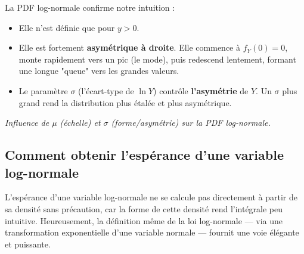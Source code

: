 \begin{intuitionbox}
La PDF log-normale confirme notre intuition :
\begin{itemize}
    \item Elle n'est définie que pour $y > 0$.
    \item Elle est fortement \textbf{asymétrique à droite}. Elle commence à $f_Y(0)=0$, monte rapidement vers un pic (le mode), puis redescend lentement, formant une longue "queue" vers les grandes valeurs.
    \item Le paramètre $\sigma$ (l'écart-type de $\ln Y$) contrôle \textbf{l'asymétrie} de $Y$. Un $\sigma$ plus grand rend la distribution plus étalée et plus asymétrique.
\end{itemize}

\tcblower
\centering
{}
\par\small\textit{Influence de $\mu$ (échelle) et $\sigma$ (forme/asymétrie) sur la PDF log-normale.}
\end{intuitionbox}

\subsection{Comment obtenir l’espérance d’une variable log-normale}

L’espérance d’une variable log-normale ne se calcule pas directement à partir de sa densité sans précaution, car la forme de cette densité rend l’intégrale peu intuitive. Heureusement, la définition même de la loi log-normale — via une transformation exponentielle d’une variable normale — fournit une voie élégante et puissante.

